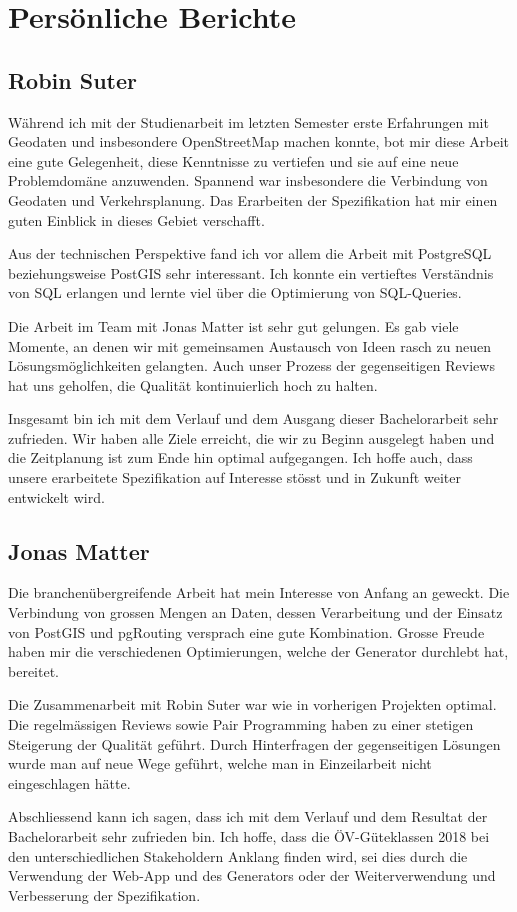 
\section{Persönliche Berichte}
\label{Persönliche Berichte}

\subsection{Robin Suter}
\label{Persönliche Berichte:Robin Suter}

Während ich mit der Studienarbeit im letzten Semester erste Erfahrungen mit Geodaten und insbesondere \gls{OpenStreetMap} machen konnte, bot mir diese Arbeit eine gute Gelegenheit, diese Kenntnisse zu vertiefen und sie auf eine neue Problemdomäne anzuwenden.
Spannend war insbesondere die Verbindung von Geodaten und Verkehrsplanung.
Das Erarbeiten der Spezifikation hat mir einen guten Einblick in dieses Gebiet verschafft.

Aus der technischen Perspektive fand ich vor allem die Arbeit mit PostgreSQL beziehungsweise PostGIS sehr interessant.
Ich konnte ein vertieftes Verständnis von SQL erlangen und lernte viel über die Optimierung von SQL-Queries.

Die Arbeit im Team mit Jonas Matter ist sehr gut gelungen.
Es gab viele Momente, an denen wir mit gemeinsamen Austausch von Ideen rasch zu neuen Lösungsmöglichkeiten gelangten.
Auch unser Prozess der gegenseitigen Reviews hat uns geholfen, die Qualität kontinuierlich hoch zu halten.

Insgesamt bin ich mit dem Verlauf und dem Ausgang dieser Bachelorarbeit sehr zufrieden.
Wir haben alle Ziele erreicht, die wir zu Beginn ausgelegt haben und die Zeitplanung ist zum Ende hin optimal aufgegangen.
Ich hoffe auch, dass unsere erarbeitete Spezifikation auf Interesse stösst und in Zukunft weiter entwickelt wird.

\subsection{Jonas Matter}
\label{Persönliche Berichte:Jonas Matter}

Die branchenübergreifende Arbeit hat mein Interesse von Anfang an geweckt.
Die Verbindung von grossen Mengen an Daten, dessen Verarbeitung und der Einsatz von PostGIS und pgRouting versprach eine gute Kombination.
Grosse Freude haben mir die verschiedenen Optimierungen, welche der Generator durchlebt hat, bereitet.

Die Zusammenarbeit mit Robin Suter war wie in vorherigen Projekten optimal.
Die regelmässigen Reviews sowie Pair Programming haben zu einer stetigen Steigerung der Qualität geführt.
Durch Hinterfragen der gegenseitigen Lösungen wurde man auf neue Wege geführt, welche man in Einzeilarbeit nicht eingeschlagen hätte.

Abschliessend kann ich sagen, dass ich mit dem Verlauf und dem Resultat der Bachelorarbeit sehr zufrieden bin.
Ich hoffe, dass die ÖV-Güteklassen 2018 bei den unterschiedlichen Stakeholdern Anklang finden wird, sei dies durch die Verwendung der Web-App und des Generators oder der Weiterverwendung und Verbesserung der Spezifikation.
